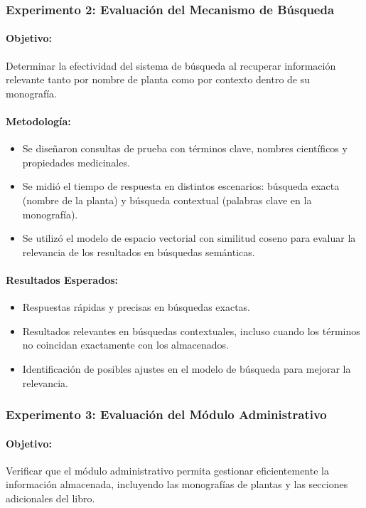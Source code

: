\vspace{2cm}
\subsubsection*{Experimento 2: Evaluación del Mecanismo de Búsqueda}
\paragraph{Objetivo:}
Determinar la efectividad del sistema de búsqueda al recuperar información relevante tanto por nombre de planta 
como por contexto dentro de su monografía.
\paragraph{Metodología:}
\begin{itemize}
    \item Se diseñaron consultas de prueba con términos clave, nombres científicos y propiedades medicinales.
    \item Se midió el tiempo de respuesta en distintos escenarios: búsqueda exacta (nombre de la planta) y búsqueda contextual (palabras clave en la monografía).
    \item Se utilizó el modelo de espacio vectorial con similitud coseno para evaluar la relevancia de los resultados en búsquedas semánticas.
\end{itemize}
\paragraph{Resultados Esperados:}
\begin{itemize}
    \item Respuestas rápidas y precisas en búsquedas exactas.
    \item Resultados relevantes en búsquedas contextuales, incluso cuando los términos no coincidan exactamente con los almacenados.
    \item Identificación de posibles ajustes en el modelo de búsqueda para mejorar la relevancia.
\end{itemize}

\vspace{2cm}
\subsubsection*{Experimento 3: Evaluación del Módulo Administrativo}
\paragraph{Objetivo:}
Verificar que el módulo administrativo permita gestionar eficientemente la información almacenada, incluyendo las monografías de plantas y las secciones adicionales del libro.
